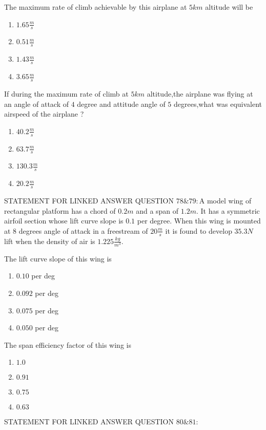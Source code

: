      \item The maximum rate of climb achievable by this airplane at $5 km$ altitude will be
     \begin{enumerate}
         \item $1.65\frac{m}{s}$
         \item $0.51\frac{m}{s}$
         \item $1.43\frac{m}{s}$
         \item $3.65\frac{m}{s}$
     \end{enumerate}
     \item If during the maximum rate of climb at $5km$ altitude,the airplane was flying at an angle of attack of $4$ degree and attitude  angle of $5$ degrees,what was equivalent airspeed of the airplane ?
     \begin{enumerate}
         \item $40.2\frac{m}{s}$
         \item $63.7\frac{m}{s}$
         \item $130.3\frac{m}{s}$
         \item $20.2\frac{m}{s}$
     \end{enumerate}
     STATEMENT FOR LINKED ANSWER QUESTION $78\&79:$A model wing of rectangular platform has a chord of $0.2 m$ and a span of $1.2 m.$ It has a symmetric airfoil section whose lift curve slope is $0.1$ per degree. When this wing is mounted at $8$ degrees angle of attack in a freestream of $20 \frac{m}{s}$ it is found to develop $35.3 N$ lift when the density of air is $1.225 \frac{kg}{m^3}.$
    \item The lift curve slope of this wing is
    \begin{enumerate}
        \item $0.10$ per deg
        \item $0.092$ per deg
        \item $0.075$ per deg
        \item $0.050$ per deg
    \end{enumerate}
    \item The span efficiency factor of this wing is 
    \begin{enumerate}
        \item $1.0$
        \item $0.91$
        \item $0.75$
        \item $0.63$
    \end{enumerate}
    STATEMENT FOR LINKED ANSWER QUESTION $80\&81:$\\
